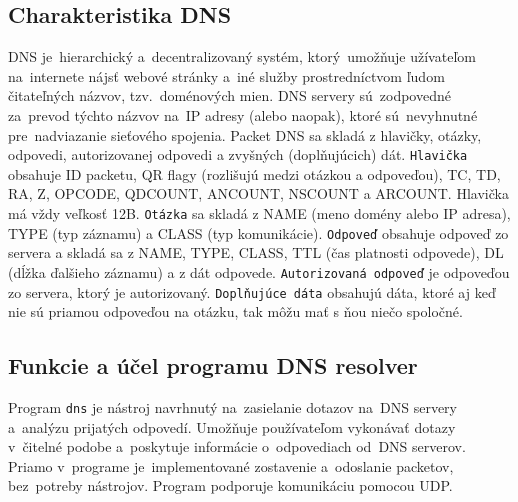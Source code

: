 \documentclass[a4paper, 11pt]{article}
\begin{document}
	\subsection{Charakteristika DNS}
	DNS je~hierarchický a~decentralizovaný systém, ktorý~umožňuje užívateľom na~internete nájsť webové stránky a~iné služby prostredníctvom ľudom čitateľných názvov, tzv.~doménových mien. DNS servery sú~zodpovedné za~prevod týchto názvov na~IP adresy (alebo naopak), ktoré sú~nevyhnutné pre~nadviazanie sieťového spojenia.\newline
	Packet DNS sa skladá z hlavičky, otázky, odpovedi, autorizovanej odpovedi a zvyšných (doplňujúcich) dát.\newline
	\texttt{Hlavička} obsahuje ID packetu, QR flagy (rozlišujú medzi otázkou a odpoveďou), TC, TD, RA, Z, OPCODE, QDCOUNT, ANCOUNT, NSCOUNT a ARCOUNT. Hlavička má vždy veľkosť 12B.\newline
	\texttt{Otázka} sa skladá z NAME (meno domény alebo IP adresa), TYPE (typ záznamu) a CLASS (typ komunikácie).\newline
	\texttt{Odpoveď} obsahuje odpoveď zo servera a skladá sa z NAME, TYPE, CLASS, TTL (čas platnosti odpovede), DL (dĺžka ďalšieho záznamu) a z dát odpovede.\newline
	\texttt{Autorizovaná odpoveď} je odpoveďou zo servera, ktorý je autorizovaný.\newline
	\texttt{Doplňujúce dáta} obsahujú dáta, ktoré aj keď nie sú priamou odpoveďou na otázku, tak môžu mať s ňou niečo spoločné.
	
	\subsection{Funkcie a účel programu DNS resolver}
	Program \texttt{dns} je nástroj navrhnutý na~zasielanie dotazov na~DNS servery a~analýzu prijatých odpovedí. Umožňuje používateľom vykonávať dotazy v~čitelné podobe a~poskytuje informácie o~odpovediach od~DNS serverov. Priamo v~programe je~implementované zostavenie a~odoslanie packetov, bez~potreby nástrojov. Program podporuje komunikáciu pomocou UDP.	

\end{document}
